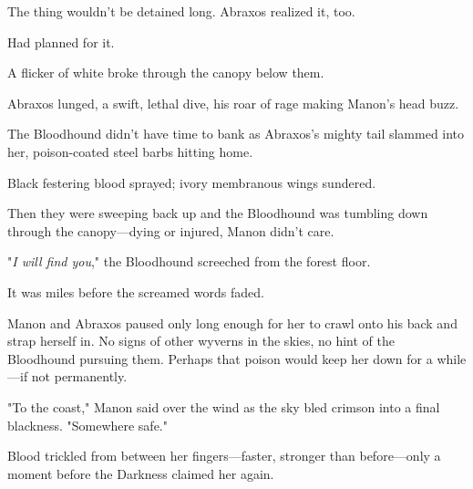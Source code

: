The thing wouldn't be detained long.
Abraxos realized it, too.

Had planned for it.

A flicker of white broke through the canopy below them.

Abraxos lunged, a swift, lethal dive, his roar of rage making Manon's head buzz.

The Bloodhound didn't have time to bank as Abraxos's mighty tail slammed into her, poison-coated steel barbs hitting home.

Black festering blood sprayed; ivory membranous wings sundered.

Then they were sweeping back up and the Bloodhound was tumbling down through the canopy---dying or injured, Manon didn't care.

"\emph{I will find you}," the Bloodhound screeched from the forest floor.

It was miles before the screamed words faded.

Manon and Abraxos paused only long enough for her to crawl onto his back and strap herself in.
No signs of other wyverns in the skies, no hint of the Bloodhound pursuing them.
Perhaps that poison would keep her down for a while---if not permanently.

"To the coast," Manon said over the wind as the sky bled crimson into a final blackness.
"Somewhere safe."

Blood trickled from between her fingers---faster, stronger than before---only a moment before the Darkness claimed her again.
